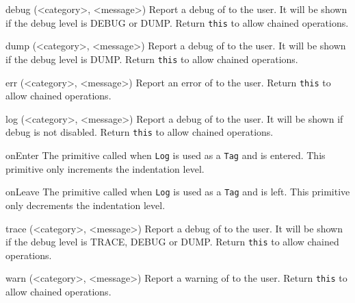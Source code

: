 \begin{urbiscriptapi}

\item[debug](<category>, <message>)%
  Report a debug  of  to the user. It will
  be shown if the debug level is DEBUG or DUMP. Return
  \lstinline|this| to allow chained operations.

\item[dump](<category>, <message>)%
  Report a debug  of  to the user. It will
  be shown if the debug level is DUMP. Return \lstinline|this| to
  allow chained operations.

\item[err](<category>, <message>)%
  Report an error  of  to the user. Return
  \lstinline|this| to allow chained operations.

\item[log](<category>, <message>)%
  Report a debug  of  to the user. It will
  be shown if debug is not disabled. Return \lstinline|this| to allow
  chained operations.

\item[onEnter]%
  The primitive called when \lstinline|Log| is used as a
  \lstinline|Tag| and is entered. This primitive only increments the
  indentation level.

\item[onLeave]%
  The primitive called when \lstinline|Log| is used as a
  \lstinline|Tag| and is left. This primitive only decrements the
  indentation level.

\item[trace](<category>, <message>)%
  Report a debug  of  to the user. It will
  be shown if the debug level is TRACE, DEBUG or DUMP. Return
  \lstinline|this| to allow chained operations.

\item[warn](<category>, <message>)%
  Report a warning  of  to the user. Return
  \lstinline|this| to allow chained operations.

\end{urbiscriptapi}

